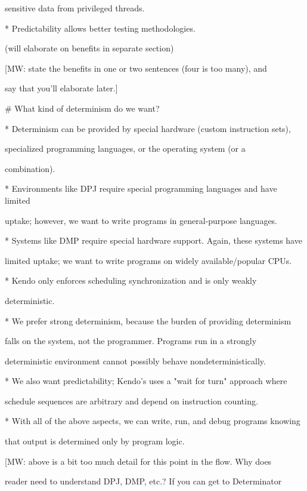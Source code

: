  sensitive data from privileged threads.

* Predictability allows better testing methodologies.



(will elaborate on benefits in separate section)



[MW: state the benefits in one or two sentences (four is too many), and

say that you'll elaborate later.]



# What kind of determinism do we want?

* Determinism can be provided by special hardware (custom instruction sets),

  specialized programming languages, or the operating system (or a

  combination).

* Environments like DPJ require special programming languages and have limited

  uptake; however, we want to write programs in general-purpose languages.

* Systems like DMP require special hardware support. Again, these systems have

  limited uptake; we want to write programs on widely available/popular CPUs.

* Kendo only enforces scheduling synchronization and is only weakly

  deterministic.

* We prefer strong determinism, because the burden of providing determinism

  falls on the system, not the programmer. Programs run in a strongly

  deterministic environment cannot possibly behave nondeterministically.

* We also want predictability; Kendo's uses a "wait for turn" approach where

  schedule sequences are arbitrary and depend on instruction counting.

* With all of the above aspects, we can write, run, and debug programs knowing

  that output is determined only by program logic.



[MW: above is a bit too much detail for this point in the flow. Why does

reader need to understand DPJ, DMP, etc.? If you can get to Determinator

